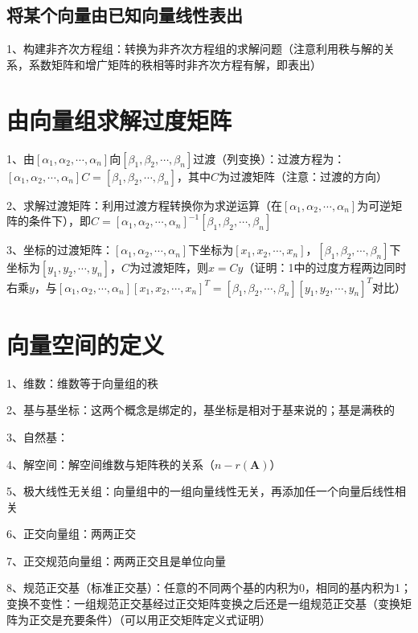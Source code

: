 \subsection{将某个向量由已知向量线性表出}

1、构建非齐次方程组：转换为非齐次方程组的求解问题（注意利用秩与解的关系，系数矩阵和增广矩阵的秩相等时非齐次方程有解，即表出）

\section{由向量组求解过度矩阵}

1、由$[\alpha_1,\alpha_2,\cdots,\alpha_n]$向$[\beta_1,\beta_2,\cdots,\beta_n]$过渡（列变换）：过渡方程为：$[\alpha_1,\alpha_2,\cdots,\alpha_n]C=[\beta_1,\beta_2,\cdots,\beta_n]$，其中$C$为过渡矩阵（注意：过渡的方向）

2、求解过渡矩阵：利用过渡方程转换你为求逆运算（在$[\alpha_1,\alpha_2,\cdots,\alpha_n]$为可逆矩阵的条件下），即$C=[\alpha_1,\alpha_2,\cdots,\alpha_n]^{-1}[\beta_1,\beta_2,\cdots,\beta_n]$

3、坐标的过渡矩阵：$[\alpha_1,\alpha_2,\cdots,\alpha_n]$下坐标为$[x_1,x_2,\cdots,x_n]$，$[\beta_1,\beta_2,\cdots,\beta_n]$下坐标为$[y_1,y_2,\cdots,y_n]$，$C$为过渡矩阵，则$x=Cy$（证明：1中的过度方程两边同时右乘$y$，与$[\alpha_1,\alpha_2,\cdots,\alpha_n][x_1,x_2,\cdots,x_n]^T=[\beta_1,\beta_2,\cdots,\beta_n][y_1,y_2,\cdots,y_n]^T$对比）

\section{向量空间的定义}

1、维数：维数等于向量组的秩

2、基与基坐标：这两个概念是绑定的，基坐标是相对于基来说的；基是满秩的

3、自然基：

4、解空间：解空间维数与矩阵秩的关系（$n-r(\boldsymbol{A})$）

5、极大线性无关组：向量组中的一组向量线性无关，再添加任一个向量后线性相关

6、正交向量组：两两正交

7、正交规范向量组：两两正交且是单位向量

8、规范正交基（标准正交基）：任意的不同两个基的内积为0，相同的基内积为1；变换不变性：一组规范正交基经过正交矩阵变换之后还是一组规范正交基（变换矩阵为正交是充要条件）（可以用正交矩阵定义式证明）

